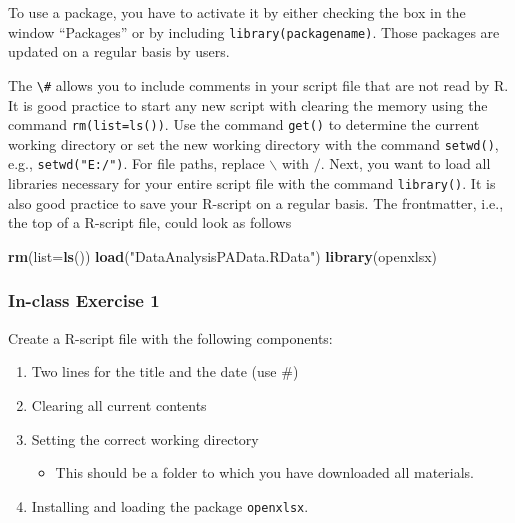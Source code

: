 \documentclass[
]{article}
\newenvironment{Shaded}{\begin{snugshade}}{\end{snugshade}}
\newcommand{\DataTypeTok}[1]{\textcolor[rgb]{0.13,0.29,0.53}{#1}}
\newcommand{\KeywordTok}[1]{\textcolor[rgb]{0.13,0.29,0.53}{\textbf{#1}}}
\newcommand{\NormalTok}[1]{#1}
\newcommand{\StringTok}[1]{\textcolor[rgb]{0.31,0.60,0.02}{#1}}
\providecommand{\tightlist}{%
  \setlength{\itemsep}{0pt}\setlength{\parskip}{0pt}}
\begin{document}
To use a package, you have to activate it by either checking the box in the window ``Packages'' or by including \texttt{library(packagename)}. Those packages are updated on a regular basis by users.

The \texttt{\textbackslash{}\#} allows you to include comments in your script file that are not read by R. It is good practice to start any new script with clearing the memory using the command \texttt{rm(list=ls())}. Use the command \texttt{get()} to determine the current working directory or set the new working directory with the command \texttt{setwd()}, e.g., \texttt{setwd("E:/")}. For file paths, replace \(\backslash\) with \(/\). Next, you want to load all libraries necessary for your entire script file with the command \texttt{library()}. It is also good practice to save your R-script on a regular basis. The frontmatter, i.e., the top of a R-script file, could look as follows

\begin{Shaded}
\begin{Highlighting}[]
\KeywordTok{rm}\NormalTok{(}\DataTypeTok{list=}\KeywordTok{ls}\NormalTok{())}
\KeywordTok{load}\NormalTok{(}\StringTok{"DataAnalysisPAData.RData"}\NormalTok{)}
\KeywordTok{library}\NormalTok{(openxlsx)}
\end{Highlighting}
\end{Shaded}

\hypertarget{in-class-exercise-1}{%
\subsubsection{In-class Exercise 1}\label{in-class-exercise-1}}

Create a R-script file with the following components:

\begin{enumerate}
\def\labelenumi{\arabic{enumi}.}
\tightlist
\item
  Two lines for the title and the date (use \#)
\item
  Clearing all current contents
\item
  Setting the correct working directory

  \begin{itemize}
  \tightlist
  \item
    This should be a folder to which you have downloaded all materials.
  \end{itemize}
\item
  Installing and loading the package \texttt{openxlsx}.
\end{enumerate}
\end{document}
